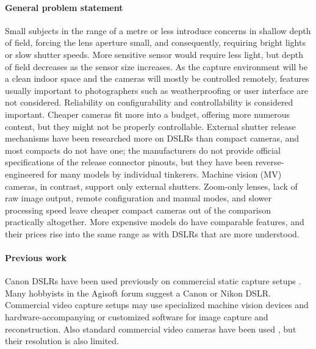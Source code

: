 \paragraph{General problem statement}
Small subjects in the range of a metre or less introduce concerns in shallow depth of field, forcing the lens aperture small, and consequently, requiring bright lights or slow shutter speeds.
More sensitive sensor would require less light, but depth of field decreases as the sensor size increases.
As the capture environment will be a clean indoor space and the cameras will mostly be controlled remotely, features usually important to photographers such as weatherproofing or user interface are not considered.
Reliability on configurability and controllability is considered important.
Cheaper cameras fit more into a budget, offering more numerous content, but they might not be properly controllable.
External shutter release mechanisms have been researched more on DSLRs than compact cameras, and most compacts do not have one;
the manufacturers do not provide official specifications of the release connector pinouts, but they have been reverse-engineered for many models by individual tinkerers.
Machine vision (MV) cameras, in contrast, support only external shutters.
Zoom-only lenses, lack of raw image output, remote configuration and manual modes, and slower processing speed leave cheaper compact cameras out of the comparison practically altogether.
More expensive models do have comparable features, and their prices rise into the same range as with DSLRs that are more understood.

\paragraph{Previous work}
Canon DSLRs have been used previously on commercial static capture setups \cite{ir-ltd,ten24,capturelab,agisoftforum}.
Many hobbyists in the Agisoft forum suggest a Canon or Nikon DSLR. \cite{agisoftforum}
Commercial video capture setups may use specialized machine vision devices and hardware-accompanying or customized software for image capture and reconstruction. \cite{TODO}
Also standard commercial video cameras have been used \cite{bradley2010high}, but their resolution is also limited.

